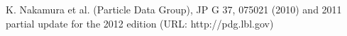 \begin{thebibliography}{99}

K. Nakamura et al. (Particle Data Group), JP G 37, 075021 (2010) and 2011 partial update for the 2012 edition (URL: http://pdg.lbl.gov)

\end{thebibliography}
